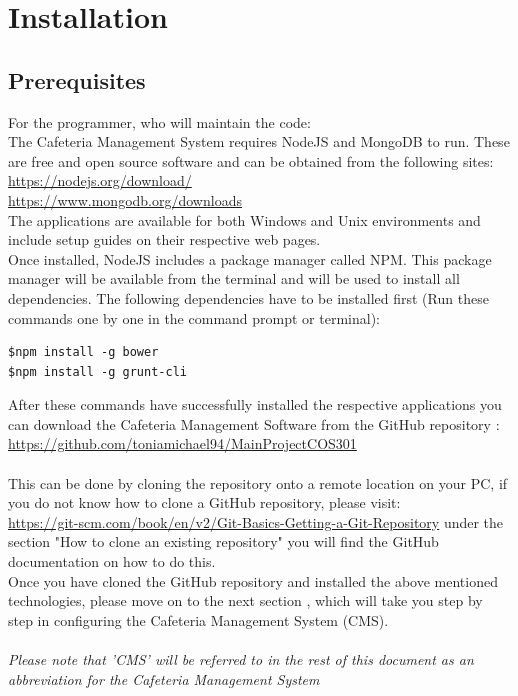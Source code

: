\documentclass[a4paper,12pt]{report}
\begin{document}
\section{Installation}

\subsection{Prerequisites}
For the programmer, who will maintain the code: \\
The Cafeteria Management System requires NodeJS and MongoDB to run. These are free and open source software and can be obtained from the following sites:\\
\url{https://nodejs.org/download/} \\
\url{https://www.mongodb.org/downloads} \\
The applications are available for both Windows and Unix environments and include setup guides on their respective web pages.\\

Once installed, NodeJS includes a package manager called NPM. This package manager will be available from the terminal and will be used to install all dependencies. The following dependencies have to be installed first (Run these commands one by one in the command prompt or terminal):
\begin{verbatim}
$npm install -g bower
$npm install -g grunt-cli
\end{verbatim}

After these commands have successfully installed the respective applications you can download the Cafeteria Management Software from the GitHub repository :
 \url{https://github.com/toniamichael94/MainProjectCOS301}
\\ \\
This can be done by cloning the repository onto a remote location on your PC, if you do not know how to clone a GitHub repository, please visit:\\
  \url{https://git-scm.com/book/en/v2/Git-Basics-Getting-a-Git-Repository}  under the section "How to clone an existing repository" you will find the GitHub documentation on how to do this.
\\
Once you have cloned the GitHub repository and installed the above mentioned technologies, please move on to the next section , which will take you step by step in configuring the Cafeteria Management System (CMS).
\\ \\
{\em Please note that 'CMS' will be referred to in the rest of this document as an abbreviation for the Cafeteria Management System}
\end{document}
